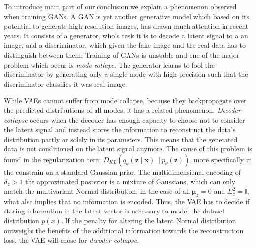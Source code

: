 To introduce main part of our conclusion we explain a phenomenon observed when training GANs. A GAN is yet another generative model which based on its potential to generate high resolution images, has drawn much attention in recent years. It consists of a generator, who's task it is to decode a latent signal to a an image, and a discriminator, which given the fake image and the real data has to distinguish between them. Training of GANs is unstable and one of the major problem which occur is \textit{mode collape}. The generator learns to fool the discriminator by generating only a single mode with high precision such that the discriminator classifies it was real image.

While VAEs cannot suffer from mode collapse, because they backpropagate over the predicted distributions of all modes, it has a related phenomenon. \textit{Decoder collapse} occurs when the decoder has enough capacity to choose not to consider the latent signal and instead stores the information to reconstruct the data's distribution partly or solely in its parameters. This means that the generated data is not conditioned on the latent signal anymore. The cause of this problem is found in the regularization term $D_{K L}\left(q_{{\phi}}\left(\mathbf{z} \mid \mathbf{x}\right) \| p_{{\theta}}(\mathbf{z})\right)$, more specifically in the constrain on a standard Gaussian prior. The multidimensional encoding of $d_z>1$ the approximated posterior is a mixture of Gaussians, which can only match the multivariant Normal distribution, in the case of all $\mathbf{\mu}_z=0$ and $\Sigma^2_z=\mathbb{I}$, what also implies that no information is encoded. Thus, the VAE has to decide if storing information in the latent vector is necessary to model the dataset distribution $p(x)$. If the penalty for altering the latent Normal distribution outweighs the benefits of the additional information towards the reconstruction loss, the VAE will chose for \textit{decoder collapse}. 




